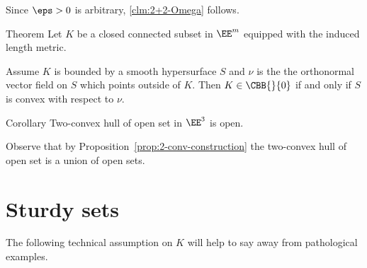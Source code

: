 Since $\eps>0$ is arbitrary, \ref{clm:2+2-Omega} follows.
\qeds









































\begin{thm}{Theorem}\label{thm:set-with-smooth-bry:CBB}
Let $K$ be a closed connected subset in $\EE^m$ equipped with the induced length metric.

Assume $K$ is bounded by a smooth hypersurface $S$ 
and $\nu$ is the the orthonormal vector field on $S$ which points outside of $K$.
Then 
$K\in \CBB{}{0}$ if and only if $S$ is convex with respect to $\nu$.
\end{thm}



















\begin{thm}{Corollary}
Two-convex hull of open set in $\EE^3$ is open.
\end{thm}

Observe that by Proposition~\ref{prop:2-conv-construction}
the two-convex hull of open set is a union of open sets.
\qeds







\section{Sturdy sets}

The following technical assumption on $K$ will help to say away from pathological examples.

